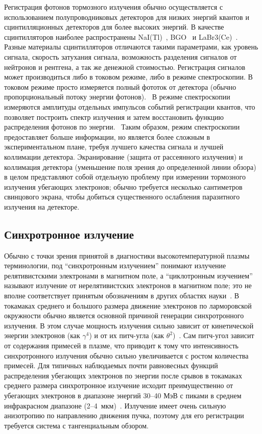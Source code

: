 Регистрация фотонов тормозного излучения обычно осуществляется с использованием полупроводниковых детекторов для низких энергий квантов и сцинтилляционных детекторов для более высоких энергий. В качестве сцинтилляторов наиболее распространены NaI(Tl)~\cite{Shevelev2004,Vlainic2015}, BGO~\cite{Shevelev2013,James2011} и LaBr3(Ce)~\cite{Shevelev2016,Nocente2010}. Разные материалы сцинтилляторов отличаются такими параметрами, как уровень сигнала, скорость затухания сигнала, возможность разделения сигналов от нейтронов и рентгена, а так же денежной стоимостью. Регистрация сигналов может производиться либо в токовом режиме, либо в режиме спектроскопии. В токовом режиме просто измеряется полный фототок от детектора (обычно пропорциональный потоку энергии фотонов).~\cite{Savrukhin2002} В режиме спектроскопии измеряются амплитуды отдельных импульсов событий регистрации квантов, что позволяет построить спектр излучения и затем восстановить функцию распределения фотонов по энергии.~\cite{Shevelev2013,Khilkevitch2013} Таким образом, режим спектроскопии предоставляет больше информации, но является более сложным в экспериментальном плане, требуя лучшего качества сигнала и лучшей коллимации детектора. Экранирование (защита от рассеянного излучения) и коллимация детектора (уменьшение поля зрения до определенной линии обзора) в целом представляют собой отдельную проблему при измерении тормозного излучения убегающих электронов; обычно требуется несколько сантиметров свинцового экрана, чтобы добиться существенного ослабления паразитного излучения на детекторе.~\cite{Cooper2016,Breizman2019}


\subsection{Синхротронное излучение}

Обычно с точки зрения принятой в диагностики высокотемпературной плазмы терминологии, под ``синхротронным излучением'' понимают излучение релятивистскими электронами в магнитном поле, а ``циклотронным изучением'' называют излучение от нерелятивистских электронов в магнитном поле; это не вполне соответствует принятым обозначениям в других областях науки~\cite{Breizman2019}. В токамаках среднего и большого размера движение электронов по ларморовской окружности обычно является основной причиной генерации синхротронного излучения. В этом случае мощность излучения сильно зависит от кинетической энергии электронов (как $\gamma^4$) и от их питч-угла (как $\theta^2$)~\cite{Pankratov1999}. Сам питч-угол зависит от содержания примесей в плазме, что приводит к тому что интенсивность синхротронного излучения обычно сильно увеличивается с ростом количества примесей. Для типичных наблюдаемых почти равновесных функций распределения убегающих электронов по энергии после срывов в токамаках среднего размера синхротронное излучение исходит преимущественно от убегающих электронов в диапазоне энергий 30--40 МэВ с пиками в среднем инфракрасном диапазоне (2--4~мкм)~\cite{Stahl2013}. Излучение имеет очень сильную анизотропию по направлению движения пучка, поэтому для его регистрации требуется система с тангенциальным обзором.~\cite{Breizman2019} 

